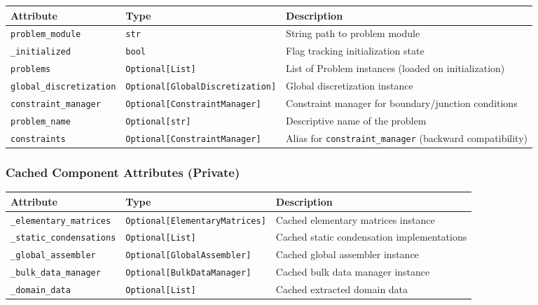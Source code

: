 \begin{longtable}{|p{3.5cm}|p{2.5cm}|p{7cm}|}
\hline
\textbf{Attribute} & \textbf{Type} & \textbf{Description} \\
\hline
\endhead

\texttt{problem\_module} & \texttt{str} & String path to problem module \\
\hline

\texttt{\_initialized} & \texttt{bool} & Flag tracking initialization state \\
\hline

\texttt{problems} & \texttt{Optional[List]} & List of Problem instances (loaded on initialization) \\
\hline

\texttt{global\_discretization} & \texttt{Optional[GlobalDiscretization]} & Global discretization instance \\
\hline

\texttt{constraint\_manager} & \texttt{Optional[ConstraintManager]} & Constraint manager for boundary/junction conditions \\
\hline

\texttt{problem\_name} & \texttt{Optional[str]} & Descriptive name of the problem \\
\hline

\texttt{constraints} & \texttt{Optional[ConstraintManager]} & Alias for \texttt{constraint\_manager} (backward compatibility) \\
\hline

\end{longtable}

\subsubsection{Cached Component Attributes (Private)}

\begin{longtable}{|p{3.5cm}|p{2.5cm}|p{7cm}|}
\hline
\textbf{Attribute} & \textbf{Type} & \textbf{Description} \\
\hline
\endhead

\texttt{\_elementary\_matrices} & \texttt{Optional[ElementaryMatrices]} & Cached elementary matrices instance \\
\hline

\texttt{\_static\_condensations} & \texttt{Optional[List]} & Cached static condensation implementations \\
\hline

\texttt{\_global\_assembler} & \texttt{Optional[GlobalAssembler]} & Cached global assembler instance \\
\hline

\texttt{\_bulk\_data\_manager} & \texttt{Optional[BulkDataManager]} & Cached bulk data manager instance \\
\hline

\texttt{\_domain\_data} & \texttt{Optional[List]} & Cached extracted domain data \\
\hline

\end{longtable}

